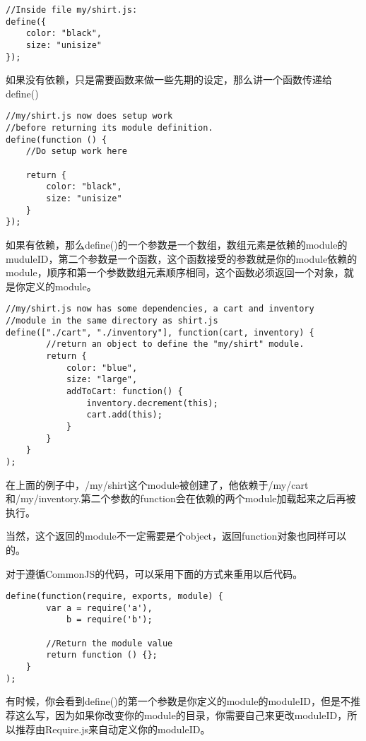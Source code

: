 \begin{lstlisting}
//Inside file my/shirt.js:
define({
    color: "black",
    size: "unisize"
});
\end{lstlisting}

    如果没有依赖，只是需要函数来做一些先期的设定，那么讲一个函数传递给define()
    \begin{lstlisting}
//my/shirt.js now does setup work
//before returning its module definition.
define(function () {
    //Do setup work here

    return {
        color: "black",
        size: "unisize"
    }
});
    \end{lstlisting}

    如果有依赖，那么define()的一个参数是一个数组，数组元素是依赖的module的muduleID，第二个参数是一个函数，这个函数接受的参数就是你的module依赖的module，顺序和第一个参数数组元素顺序相同，这个函数必须返回一个对象，就是你定义的module。

    \begin{lstlisting}
//my/shirt.js now has some dependencies, a cart and inventory
//module in the same directory as shirt.js
define(["./cart", "./inventory"], function(cart, inventory) {
        //return an object to define the "my/shirt" module.
        return {
            color: "blue",
            size: "large",
            addToCart: function() {
                inventory.decrement(this);
                cart.add(this);
            }
        }
    }
);
    \end{lstlisting}

    在上面的例子中，/my/shirt这个module被创建了，他依赖于/my/cart和/my/inventory.第二个参数的function会在依赖的两个module加载起来之后再被执行。

    当然，这个返回的module不一定需要是个object，返回function对象也同样可以的。

    对于遵循CommonJS的代码，可以采用下面的方式来重用以后代码。

    \begin{lstlisting}
define(function(require, exports, module) {
        var a = require('a'),
            b = require('b');

        //Return the module value
        return function () {};
    }
);
    \end{lstlisting}

    有时候，你会看到define()的第一个参数是你定义的module的moduleID，但是不推荐这么写，因为如果你改变你的module的目录，你需要自己来更改moduleID，所以推荐由Require.js来自动定义你的moduleID。

